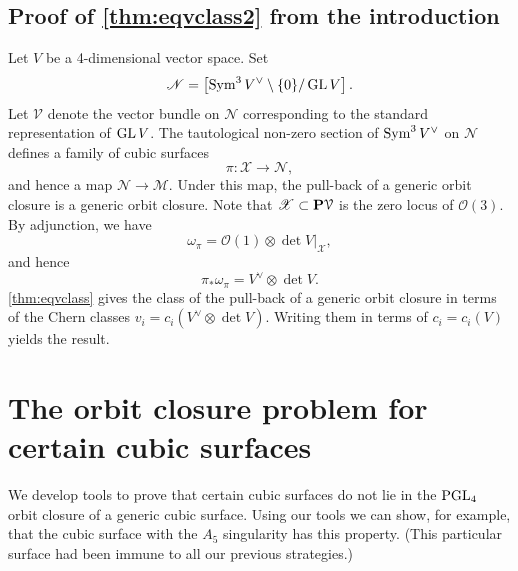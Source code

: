 \documentclass[12pt,reqno]{amsart}
\renewcommand{\to}{{\longrightarrow}}
\numberwithin{equation}{section}
\renewcommand{\O}{\mathcal O}
\begin{document}
\subsection{Proof of \texorpdfstring{\autoref{thm:eqvclass2}}{second theorem} from the introduction}\label{proof:eqvclass2}
Let $V$ be a 4-dimensional vector space.
Set
\[\mathscr N = \left[ \Sym^3V^\vee \setminus \{0\} / \GL V \right]. \]
Let $\mathcal V$ denote the vector bundle on $\mathscr N$ corresponding to the standard representation of $\GL V$.
The tautological non-zero section of $\Sym^3V^\vee$ on $\mathscr N$ defines a family of cubic surfaces
\[ \pi \colon \mathscr X \to \mathscr N,\]
and hence a map $\mathscr N \to \mathscr M$.
Under this map, the pull-back of a generic orbit closure is a generic orbit closure.
Note that $\mathscr X \subset \P \mathcal V$ is the zero locus of $\O(3)$.
By adjunction, we have
\[ \omega_\pi = \O(1) \otimes \det V |_{\mathscr X},\]
and hence
\[ \pi_* \omega_\pi = V^\vee \otimes \det V.\]
\autoref{thm:eqvclass} gives the class of the pull-back of a generic orbit closure in terms of the Chern classes $v_i = c_i(V^\vee \otimes \det V)$.
Writing them in terms of $c_i = c_i(V)$ yields the result.

\appendix

\section{The orbit closure problem for certain cubic surfaces}
We develop tools to prove that certain cubic surfaces do not lie in the $\PGL_4$ orbit closure of a generic cubic surface.
Using our tools we can show, for example, that the cubic surface with the $A_5$ singularity has this property.
(This particular surface had been immune to all our previous strategies.)
\end{document}
